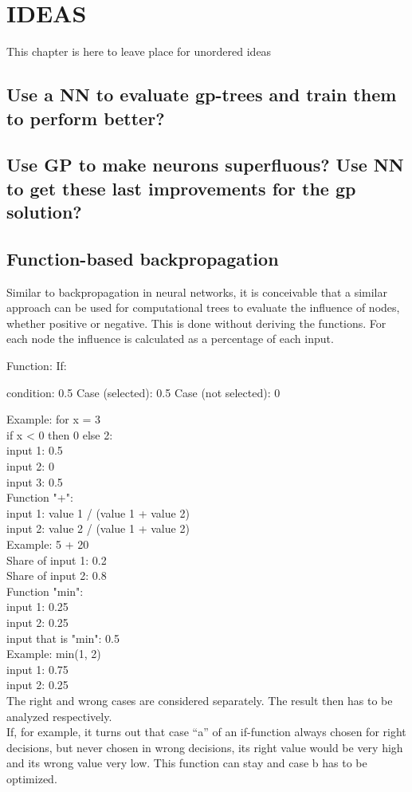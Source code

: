

\chapter{IDEAS}
This chapter is here to leave place for unordered ideas

\section{Use a NN to evaluate gp-trees and train them to perform better?}

\section{Use GP to make neurons superfluous? Use NN to get these last improvements for the gp solution?}

\section{Function-based backpropagation}
Similar to backpropagation in neural networks, it is conceivable that a similar approach can be used for computational trees to evaluate the influence of nodes, whether positive or negative. This is done without deriving the functions.
For each node the influence is calculated as a percentage of each input.

Function: If:

condition: 0.5
Case (selected): 0.5
Case (not selected): 0

\smallskip
Example: for x = 3\\
if x < 0 then 0 else 2:\\
input 1: 0.5\\
input 2: 0\\
input 3: 0.5 \\
\smallskip
Function "+":\\
input 1: value 1 / (value 1 + value 2)\\
input 2: value 2 / (value 1 + value 2)\\
Example: 5 + 20\\
Share of input 1: 0.2\\
Share of input 2: 0.8\\

\smallskip
Function "min":\\
input 1: 0.25\\
input 2: 0.25\\
input that is "min": 0.5\\
Example: min(1, 2)\\
input 1: 0.75\\
input 2: 0.25\\
\smallskip
The right and wrong cases are considered separately. The result then has to be analyzed respectively.\\
If, for example, it turns out that case ``a'' of an if-function always chosen for right decisions, but never chosen in wrong decisions, its right value would be very high and its wrong value very low. This function can stay and case b has to be optimized.

